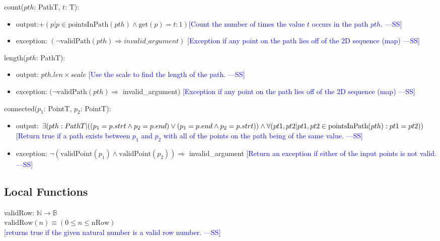 \documentclass[12pt]{article}
\newcommand{\authornote}[3]{\textcolor{#1}{[#3 ---#2]}}
\newcommand{\authornote}[3]{}
\newcommand{\wss}[1]{\authornote{blue}{SS}{#1}}
\begin{document}
\noindent count($\mathit{pth}$: PathT, $t$: T):
\begin{itemize}
\item output:$+(p | p \in \mbox{pointsInPath}(pth) \land \mbox{get}(p) = t : 1)$\wss{Count the number of times the value $t$ occurs in the path
    $pth$.}
\item exception: $(\lnot \mbox{validPath}(pth) \Rightarrow invalid\_argument)$ \wss{Exception if any point on the path lies off of the 2D
    sequence (map)}
\end{itemize}

\noindent length($\mathit{pth}$: PathT):
\begin{itemize}
\item output: $pth.len \times scale$  \wss{Use the scale to find the length of the
    path.}
\item exception: $(\lnot \mbox{validPath}(pth) \Rightarrow$ invalid\_argument) \wss{Exception if any point on the path lies off of the 2D
    sequence (map)}
\end{itemize}

\noindent connected($p_1$: PointT, $p_2$: PointT):
\begin{itemize}
\item output: $\exists(pth : PathT | ( (p_1 = p.strt \land p_2 = p.end) \lor \\
                                   (p_1 = p.end \land p_2 = p.strt) ) \land \\
                                    \forall(pt1,pt2 | pt1,pt2 \in \mbox{pointsInPath}(pth): pt1 = pt2))$ 
                                   \wss{Return true if a path exists between $p_1$ and $p_2$ with all of the points on the path being of the same value.}
\item exception: $\lnot (\mbox{validPoint}(p_1) \land \mbox{validPoint}(p_2)) \Rightarrow$ invalid\_argument \wss{Return an exception if either of the input points is not
    valid.}

\end{itemize}

\subsection*{Local Functions}

\noindent validRow: $\mathbb{N} \rightarrow \mathbb{B}$\\
\noindent $\mbox{validRow}(n) \equiv (0 \leq n \leq \mbox{nRow})$ \\ \wss{returns true if the given natural number is a valid row
  number.}\\
\end{document}
